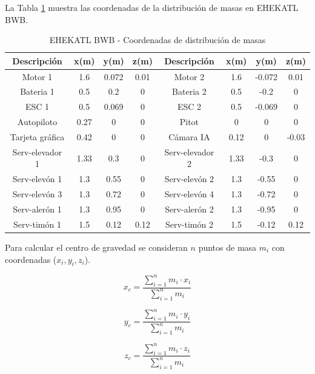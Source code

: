 La Tabla \ref{Coordendas de distribución de masas} muestra las coordenadas de la distribución de masas en EHEKATL BWB. 
\begin{table}[!h]
    \centering
    \caption{ EHEKATL BWB - Coordenadas de distribución de masas}
    \begin{tabular}{|c|c|c|c||c|c|c|c|}
    \hline
    \textbf{Descripción} & \textbf{x(m)} & \textbf{y(m)} & \textbf{z(m)} & \textbf{Descripción} & \textbf{x(m)} & \textbf{y(m)} & \textbf{z(m)} \\
    \hline
    Motor 1 & 1.6 & 0.072 & 0.01 & Motor 2 & 1.6 & -0.072 & 0.01 \\
    Bateria 1 & 0.5 & 0.2 & 0 & Bateria 2 & 0.5 & -0.2 & 0 \\
    ESC 1 & 0.5 & 0.069 & 0 & ESC 2 & 0.5 & -0.069 & 0 \\
    Autopiloto & 0.27 & 0 & 0 & Pitot & 0 & 0 & 0 \\
    Tarjeta gráfica & 0.42 & 0 & 0 & Cámara IA &  0.12 & 0 & -0.03  \\
    Serv-elevador 1 & 1.33  & 0.3 & 0 & Serv-elevador 2 & 1.33 & -0.3 & 0\\
    Serv-elevón 1 & 1.3 & 0.55 & 0 & Serv-elevón 2 & 1.3 & -0.55 & 0\\
    Serv-elevón 3 & 1.3 & 0.72 & 0 & Serv-elevón 4 & 1.3 & -0.72 & 0\\
    Serv-alerón 1 & 1.3 & 0.95 & 0 & Serv-alerón 2 & 1.3 & -0.95 & 0\\
    Serv-timón 1 & 1.5 & 0.12 & 0.12 & Serv-timón 2 & 1.5 & -0.12 & 0.12\\
    \hline
    \end{tabular}
    \label{Coordendas de distribución de masas}
\end{table}

Para calcular el centro de gravedad se consideran $n$ puntos de masa $m_i$ con coordenadas ($x_i, y_i, z_i$).  

\begin{equation}
   x_{c} = \frac{\sum_{i=1}^{n} m_i \cdot x_i}{\sum_{i=1}^{n} m_i} 
\end{equation}

\begin{equation}
    y_{c} = \frac{\sum_{i=1}^{n} m_i \cdot y_i}{\sum_{i=1}^{n} m_i}
\end{equation}

\begin{equation}
   z_{c} = \frac{\sum_{i=1}^{n} m_i \cdot z_i}{\sum_{i=1}^{n} m_i} 
\end{equation}

